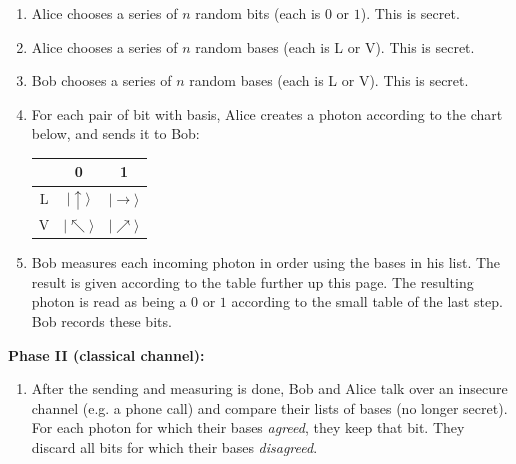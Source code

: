 \documentclass{article}
\theoremstyle{plain}
\theoremstyle{definition}
\theoremstyle{remark}
\numberwithin{theorem}{section}
\begin{document}
\begin{enumerate}
\item Alice chooses a series of $n$ random bits (each is $0$ or $1$).  This is secret.
\item Alice chooses a series of $n$ random bases (each is L or V).  This is secret.
\item Bob chooses a series of $n$ random bases (each is L or V).  This is secret.
\item For each pair of bit with basis, Alice creates a photon according to the chart below, and sends it to Bob:
%
%

\vspace{1em}

\begin{center}

\begin{tabular}{c|cc}
 & 0 & 1 \\
\hline
L & $|\uparrow \rangle$ & $|\rightarrow \rangle$ \\ 
V & $|\nwarrow \rangle$ & $|\nearrow \rangle$ 
\end{tabular}

\end{center}
\vspace{1em}

    \item Bob measures each incoming photon in order using the bases in his list.  The result is given according to the table further up this page.  The resulting photon is read as being a $0$ or $1$ according to the small table of the last step.  Bob records these bits.
    \end{enumerate}
    \textbf{Phase II (classical channel):}
    \begin{enumerate}
    \item   After the sending and measuring is done, Bob and Alice talk over an insecure channel (e.g. a phone call) and compare their lists of bases (no longer secret).  For each photon for which their bases \emph{agreed}, they keep that bit.  They discard all bits for which their bases \emph{disagreed}.
        \end{enumerate}
\end{document}
